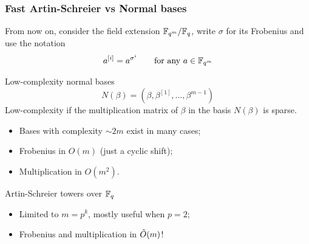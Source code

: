 \documentclass[10pt]{beamer}
\renewcommand{\emph}[1]{{\usebeamercolor[fg]{structure}#1}}
\begin{document}
\begin{frame}
  \frametitle{Fast Artin-Schreier vs Normal bases}

  From now on, consider the field extension \alert{$\mathbb{F}_{q^m}/\mathbb{F}_q$},
  write \alert{$\sigma$} for its Frobenius and use the notation
  \[a^{[i]} = a^{\sigma^i} \qquad\text{for any $a\in\mathbb{F}_{q^m}$}\]

  \begin{block}{Low-complexity normal bases}
    \[N(\beta) = (\beta, \beta^{[1]}, \ldots, \beta^{m-1})\]
    \emph{Low-complexity} if the multiplication matrix of $\beta$ in
    the basis $N(\beta)$ is sparse.

    \begin{itemize}
    \item Bases with complexity $\sim 2m$ exist in many cases;
    \item Frobenius in \alert{$O(m)$} (just a cyclic shift);
    \item Multiplication in \alert{$O(m^2)$}.
    \end{itemize}
  \end{block}

  \begin{block}{Artin-Schreier towers over $\mathbb{F}_q$}
    \begin{itemize}
    \item Limited to $m=p^k$, mostly useful when $p=2$;
    \item Frobenius \alert{and} multiplication in \alert{$\tilde{O}(m)$}!
    \end{itemize}
  \end{block}
\end{frame}

\end{document}

